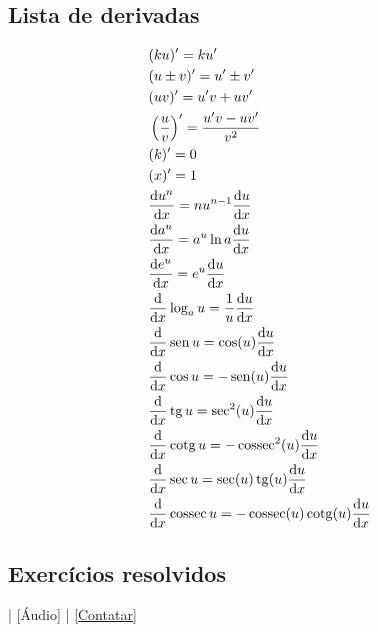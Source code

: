 \subsection{Lista de derivadas}

\begin{align}
  & (ku)' = ku' \\
  & (u\pm v)' = u' \pm v'\\
  & (uv)' = u'v + uv' \\
  & \left(\frac{u}{v}\right)' = \frac{u'v - uv'}{v^2} \\
  & (k)' = 0 \\
  & (x)' = 1 \\
  & \frac{\mathrm{d} u^n}{\mathrm{d} x} = nu^{n-1}\frac{\mathrm{d} u}{\mathrm{d} x}\\
  & \frac{\mathrm{d} a^u}{\mathrm{d} x} = a^u\ln a\frac{\mathrm{d} u}{\mathrm{d} x} \\
  & \frac{\mathrm{d} e^u}{\mathrm{d} x} = e^u\frac{\mathrm{d} u}{\mathrm{d} x} \\
  & \frac{\mathrm{d}}{\mathrm{d} x}\log_a u = \frac{1}{u}\frac{\mathrm{d} u}{\mathrm{d} x}\\
  & \frac{\mathrm{d}}{\mathrm{d} x}\operatorname{sen} u = \cos(u)\frac{\mathrm{d} u}{\mathrm{d} x} \\
  & \frac{\mathrm{d}}{\mathrm{d} x}\cos u = - \operatorname{sen}(u)\frac{\mathrm{d} u}{\mathrm{d} x}\\
  & \frac{\mathrm{d}}{\mathrm{d} x}\operatorname{tg} u = \sec^2(u)\frac{\mathrm{d} u}{\mathrm{d} x} \\
  & \frac{\mathrm{d}}{\mathrm{d} x}\operatorname{cotg} u = -\operatorname{cossec}^2(u)\frac{\mathrm{d} u}{\mathrm{d} x} \\
  & \frac{\mathrm{d}}{\mathrm{d} x}\sec u = \sec(u)\operatorname{tg}(u)\frac{\mathrm{d} u}{\mathrm{d} x} \\
  & \frac{\mathrm{d}}{\mathrm{d} x}\operatorname{cossec} u = -\operatorname{cossec}(u)\operatorname{cotg}(u)\frac{\mathrm{d} u}{\mathrm{d} x}
\end{align}

\subsection*{Exercícios resolvidos}

\begin{flushright}
  [Vídeo] | [Áudio] | \href{https://phkonzen.github.io/notas/contato.html}{[Contatar]}
\end{flushright}


